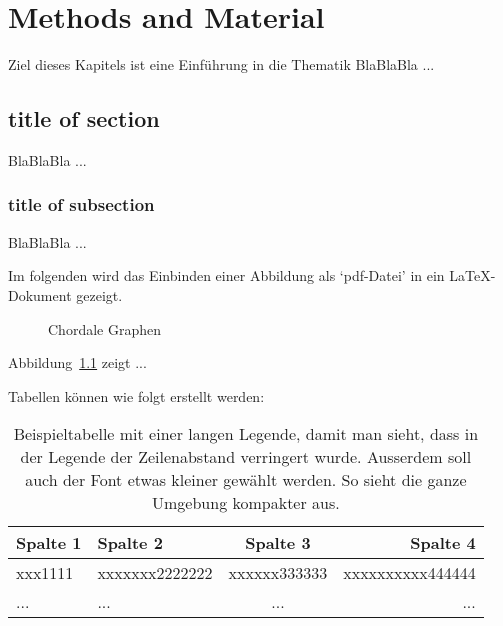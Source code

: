 
\chapter{Methods and Material}
  \label{MetMat}

\noindent
Ziel dieses Kapitels ist eine Einf\"uhrung in die Thematik BlaBlaBla ...

\section{title of section}
  \label{Abschnittslabel} 

BlaBlaBla ...

\subsection{title of subsection}
  \label{Unterabschnittslabel}

BlaBlaBla ...

Im folgenden wird das Einbinden einer Abbildung als `pdf-Datei' in ein
\LaTeX-Dokument gezeigt.

\begin{figure}[htb]
     \centerline{}
  \caption{Chordale Graphen}
  \label{fig2.1}
\end{figure}

Abbildung~\ref{fig2.1} zeigt ...

Tabellen k\"onnen wie folgt erstellt werden:

{
\renewcommand{\baselinestretch}{0.9} 
\normalsize
\begin{table}[htb]
\begin{tabular}{|p{2.7cm}||l|c|r|}
\hline
    \textbf{Spalte 1} 
  & \textbf{Spalte 2} 
  & \textbf{Spalte 3} 
  & \textbf{Spalte 4} \\
  \hline\hline
  xxx1111
  & xxxxxxx2222222
  & xxxxxx333333 
  & xxxxxxxxxx444444 \\
  \hline
    ...
  & ...
  & ...
  & ...\\
  \hline
\end{tabular}
  \caption[Beispieltabelle mit einer langen Legende]{Beispieltabelle mit einer langen Legende, damit man sieht, dass in der Legende der Zeilenabstand verringert wurde. Ausserdem soll auch der Font etwas kleiner gew\"ahlt werden. So sieht die ganze Umgebung kompakter aus.}
  \label{tabelle-1}
\end{table}
}

